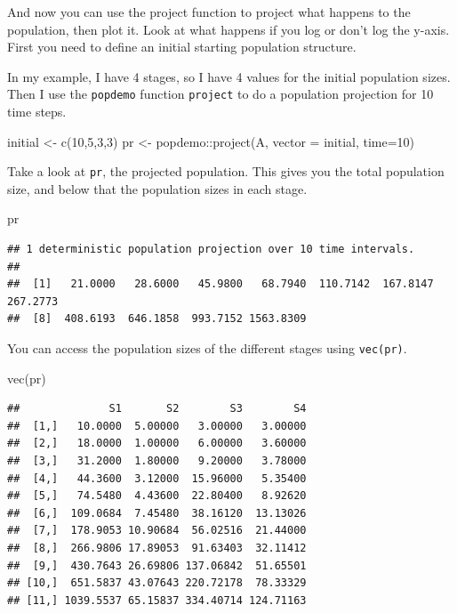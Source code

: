 \documentclass[
  a4paper]{book}
\newenvironment{Shaded}{\begin{snugshade}}{\end{snugshade}}
\newcommand{\AttributeTok}[1]{\textcolor[rgb]{0.77,0.63,0.00}{#1}}
\newcommand{\DecValTok}[1]{\textcolor[rgb]{0.00,0.00,0.81}{#1}}
\newcommand{\FunctionTok}[1]{\textcolor[rgb]{0.00,0.00,0.00}{#1}}
\newcommand{\NormalTok}[1]{#1}
\newcommand{\OtherTok}[1]{\textcolor[rgb]{0.56,0.35,0.01}{#1}}
\newcommand{\SpecialCharTok}[1]{\textcolor[rgb]{0.00,0.00,0.00}{#1}}
\begin{document}
And now you can use the project function to project what happens to the
population, then plot it. Look at what happens if you log or don't log
the y-axis. First you need to define an initial starting population
structure.

In my example, I have 4 stages, so I have 4 values for the initial
population sizes. Then I use the \texttt{popdemo} function
\texttt{project} to do a population projection for 10 time steps.

\begin{Shaded}
\begin{Highlighting}[]
\NormalTok{initial }\OtherTok{\textless{}{-}} \FunctionTok{c}\NormalTok{(}\DecValTok{10}\NormalTok{,}\DecValTok{5}\NormalTok{,}\DecValTok{3}\NormalTok{,}\DecValTok{3}\NormalTok{)}
\NormalTok{pr }\OtherTok{\textless{}{-}}\NormalTok{ popdemo}\SpecialCharTok{::}\FunctionTok{project}\NormalTok{(A, }\AttributeTok{vector =}\NormalTok{ initial, }\AttributeTok{time=}\DecValTok{10}\NormalTok{)}
\end{Highlighting}
\end{Shaded}

Take a look at \texttt{pr}, the projected population. This gives you the
total population size, and below that the population sizes in each
stage.

\begin{Shaded}
\begin{Highlighting}[]
\NormalTok{pr}
\end{Highlighting}
\end{Shaded}

\begin{verbatim}
## 1 deterministic population projection over 10 time intervals.
## 
##  [1]   21.0000   28.6000   45.9800   68.7940  110.7142  167.8147  267.2773
##  [8]  408.6193  646.1858  993.7152 1563.8309
\end{verbatim}

You can access the population sizes of the different stages using
\texttt{vec(pr)}.

\begin{Shaded}
\begin{Highlighting}[]
\FunctionTok{vec}\NormalTok{(pr)}
\end{Highlighting}
\end{Shaded}

\begin{verbatim}
##              S1       S2        S3        S4
##  [1,]   10.0000  5.00000   3.00000   3.00000
##  [2,]   18.0000  1.00000   6.00000   3.60000
##  [3,]   31.2000  1.80000   9.20000   3.78000
##  [4,]   44.3600  3.12000  15.96000   5.35400
##  [5,]   74.5480  4.43600  22.80400   8.92620
##  [6,]  109.0684  7.45480  38.16120  13.13026
##  [7,]  178.9053 10.90684  56.02516  21.44000
##  [8,]  266.9806 17.89053  91.63403  32.11412
##  [9,]  430.7643 26.69806 137.06842  51.65501
## [10,]  651.5837 43.07643 220.72178  78.33329
## [11,] 1039.5537 65.15837 334.40714 124.71163
\end{verbatim}
\end{document}
